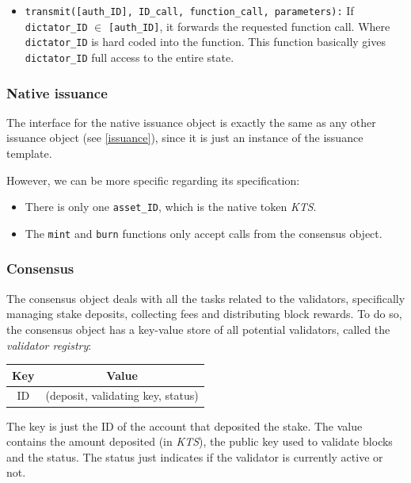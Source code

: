 \documentclass[conference]{IEEEtran}
\begin{document}
\begin{itemize}
	\item \texttt{transmit([auth\_ID], ID\_call, function\_call, parameters):} If \texttt{dictator\_ID} $\in$ \texttt{[auth\_ID]}, it forwards the requested function call. Where \texttt{dictator\_ID} is hard coded into the function. This function basically gives \texttt{dictator\_ID} full access to the entire state.
\end{itemize}

\subsubsection{Native issuance}
The interface for the native issuance object is exactly the same as any other issuance object (see \ref{issuance}), since it is just an instance of the issuance template.

However, we can be more specific regarding its specification:

\begin{itemize}
	\item There is only one \texttt{asset\_ID}, which is the native token \textit{KTS}.
	\item The \texttt{mint} and \texttt{burn} functions only accept calls from the consensus object.
\end{itemize}

\subsubsection{Consensus}
The consensus object deals with all the tasks related to the validators, specifically managing stake deposits, collecting fees and distributing block rewards. To do so, the consensus object has a key-value store of all potential validators, called the \textit{validator registry}:

\begin{center}
	\begin{tabular}[c]{c|c}
		Key & Value \\
		\hline
		ID & (deposit, validating key, status) \\
	\end{tabular}
\end{center}

The key is just the ID of the account that deposited the stake. The value contains the amount deposited (in \textit{KTS}), the public key used to validate blocks and the status. The status just indicates if the validator is currently active or not.
\end{document}
